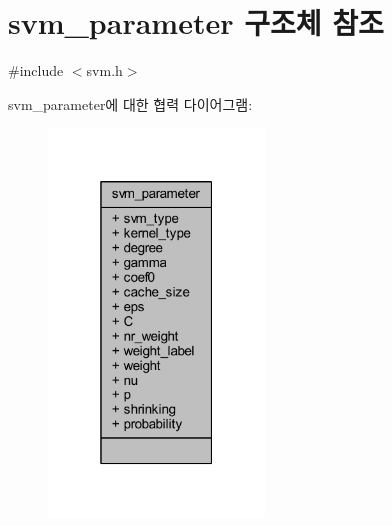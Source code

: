 \hypertarget{structsvm__parameter}{\section{svm\+\_\+parameter 구조체 참조}
\label{structsvm__parameter}
}


{\ttfamily \#include $<$svm.\+h$>$}



svm\+\_\+parameter에 대한 협력 다이어그램\+:
\nopagebreak
\begin{figure}[H]
\begin{center}
\leavevmode
\includegraphics[width=163pt]{structsvm__parameter__coll__graph}
\end{center}
\end{figure}
